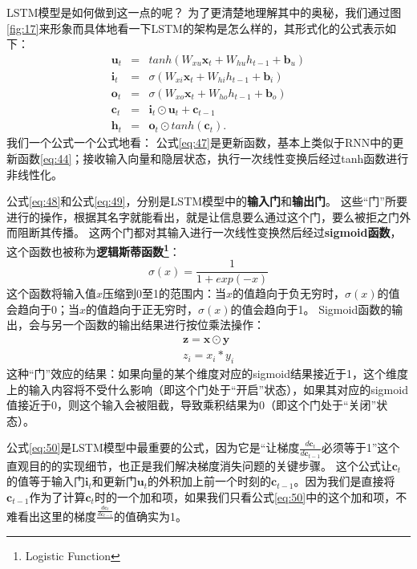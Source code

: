 \documentclass[10pt,a4paper]{ctexart}
\begin{document}
LSTM模型是如何做到这一点的呢？
为了更清楚地理解其中的奥秘，我们通过图\ref{fig:17}来形象而具体地看一下LSTM的架构是怎么样的，其形式化的公式表示如下：
\begin{eqnarray}
 \textbf{u}_t & = & tanh(W_{xu}\textbf{x}_t + W_{hu}h_{t-1} + \textbf{b}_u) \label{eq:47} \\
 \textbf{i}_t & = & \sigma (W_{xi}\textbf{x}_t + W_{hi}h_{t-1} + \textbf{b}_i) \label{eq:48}\\
 \textbf{o}_t & = & \sigma (W_{xo}\textbf{x}_t + W_{ho}h_{t-1} + \textbf{b}_o) \label{eq:49}\\
 \textbf{c}_t & = & \textbf{i}_t \odot \textbf{u}_t + \textbf{c}_{t-1} \label{eq:50} \\
 \textbf{h}_t & = & \textbf{o}_t \odot tanh(\textbf{c}_t). \label{eq:51}
\end{eqnarray}
我们一个公式一个公式地看：
公式\ref{eq:47}是更新函数，基本上类似于RNN中的更新函数\ref{eq:44}；接收输入向量和隐层状态，执行一次线性变换后经过tanh函数进行非线性化。

公式\ref{eq:48}和公式\ref{eq:49}，分别是LSTM模型中的\textbf{输入门}和\textbf{输出门}。
这些“门”所要进行的操作，根据其名字就能看出，就是让信息要么通过这个门，要么被拒之门外而阻断其传播。
这两个门都对其输入进行一次线性变换然后经过\textbf{sigmoid函数}，这个函数也被称为\textbf{逻辑斯蒂函数\footnote{Logistic Function}}：
\begin{equation} \label{eq:52}
 \sigma (x) = \frac{1}{1 + exp(-x)}
\end{equation}
这个函数将输入值$x$压缩到0至1的范围内：当$x$的值趋向于负无穷时，$\sigma(x)$的值会趋向于0；当$x$的值趋向于正无穷时，$\sigma(x)$的值会趋向于1。
Sigmoid函数的输出，会与另一个函数的输出结果进行按位乘法操作：
\[
 \begin{array}{l}
 \textbf{z} = \textbf{x} \odot \textbf{y} \\
 z_i = x_i * y_i
 \end{array}
\]
这种“门”效应的结果：如果向量的某个维度对应的sigmoid结果接近于1，这个维度上的输入内容将不受什么影响（即这个门处于“开启”状态），如果其对应的sigmoid值接近于0，则这个输入会被阻截，导致乘积结果为0（即这个门处于“关闭”状态）。

公式\ref{eq:50}是LSTM模型中最重要的公式，因为它是“让梯度$\frac{d\textbf{c}_t}{d\textbf{c}_{t-1}}$必须等于1”这个直观目的的实现细节，也正是我们解决梯度消失问题的关键步骤。
这个公式让$\textbf{c}_t$的值等于输入门$\textbf{i}_t$和更新门$\textbf{u}_t$的外积加上前一个时刻的$\textbf{c}_{t-1}$。因为我们是直接将$\textbf{c}_{t-1}$作为了计算$\textbf{c}_t$时的一个加和项，如果我们只看公式\ref{eq:50}中的这个加和项，不难看出这里的梯度$\frac{\frac{d\textbf{c}_t}{d\textbf{c}_{t-1}}}{}$的值确实为1。
\end{document}

